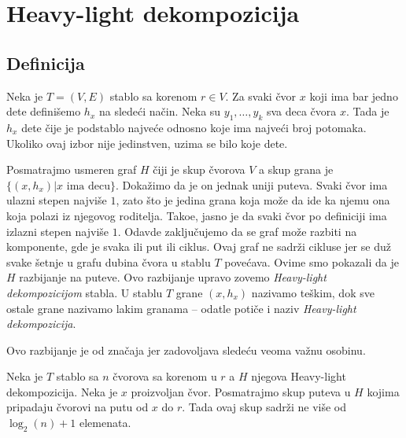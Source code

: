 \section{Heavy-light dekompozicija}

\subsection{Definicija}

Neka je $T = (V,E)$ stablo sa korenom $r \in V$. Za svaki \v cvor $x$ koji ima bar jedno dete defini\v semo $h_x$ na slede\' ci na\v cin. Neka su $y_1, \ldots, y_k$ sva deca \v cvora $x$. Tada je $h_x$ dete \v cije je podstablo najve\' ce odnosno koje ima najve\' ci broj potomaka. Ukoliko ovaj izbor nije jedinstven, uzima se bilo koje dete.

Posmatrajmo usmeren graf $H$ \v ciji je skup \v cvorova $V$ a skup grana je $\{(x, h_x) | x \text{ ima decu}\}$. Doka\v zimo da je on jednak uniji puteva. Svaki \v cvor ima ulazni stepen najvi\v se $1$, zato \v sto je jedina grana koja mo\v ze da ide ka njemu ona koja polazi iz njegovog roditelja. Tako\dj e, jasno je da svaki \v cvor po definiciji ima izlazni stepen najvi\v se $1$. Odavde zaklju\v cujemo da se graf mo\v ze razbiti na komponente, gde je svaka ili put ili ciklus. Ovaj graf ne sadr\v zi cikluse jer se du\v z svake \v setnje u grafu dubina \v cvora u stablu $T$ pove\' cava. Ovime smo pokazali da je $H$ razbijanje na puteve. Ovo razbijanje upravo zovemo \textit{Heavy-light dekompozicijom} stabla. U stablu $T$ grane $(x, h_x)$ nazivamo te\v skim, dok sve ostale grane nazivamo lakim granama -- odatle poti\v ce i naziv \textit{Heavy-light dekompozicija}.

Ovo razbijanje je od zna\v caja jer zadovoljava slede\' cu veoma va\v znu osobinu.

\begin{thm}
\label{teoremalakegrane}
Neka je $T$ stablo sa $n$ \v cvorova sa korenom u $r$ a $H$ njegova Heavy-light dekompozicija. Neka je $x$ proizvoljan \v cvor. Posmatrajmo skup puteva u $H$ kojima pripadaju \v cvorovi na putu od $x$ do $r$. Tada ovaj skup sadr\v zi ne vi\v se od $\log_2(n) + 1$ elemenata.
\end{thm}

